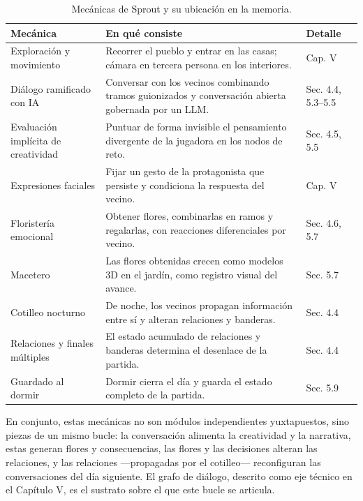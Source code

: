 \documentclass[12pt,twoside,titlepage]{report}
\begin{document}
\begin{table}[h]
  \centering
  \caption{Mecánicas de Sprout y su ubicación en la memoria.}
  \label{tab:mecanicas}
  \begin{footnotesize}
  \renewcommand{\arraystretch}{1.3}
  \begin{tabular}{p{3.6cm}p{7.4cm}p{2cm}}
    \hline
    \textbf{Mecánica} & \textbf{En qué consiste} & \textbf{Detalle} \\
    \hline
    Exploración y movimiento & Recorrer el pueblo y entrar en las casas; cámara en tercera persona en los interiores. & Cap. V \\
    \hline
    Diálogo ramificado con IA & Conversar con los vecinos combinando tramos guionizados y conversación abierta gobernada por un LLM. & Sec. 4.4, 5.3--5.5 \\
    \hline
    Evaluación implícita de creatividad & Puntuar de forma invisible el pensamiento divergente de la jugadora en los nodos de reto. & Sec. 4.5, 5.5 \\
    \hline
    Expresiones faciales & Fijar un gesto de la protagonista que persiste y condiciona la respuesta del vecino. & Cap. V \\
    \hline
    Floristería emocional & Obtener flores, combinarlas en ramos y regalarlas, con reacciones diferenciales por vecino. & Sec. 4.6, 5.7 \\
    \hline
    Macetero & Las flores obtenidas crecen como modelos 3D en el jardín, como registro visual del avance. & Sec. 5.7 \\
    \hline
    Cotilleo nocturno & De noche, los vecinos propagan información entre sí y alteran relaciones y banderas. & Sec. 4.4 \\
    \hline
    Relaciones y finales múltiples & El estado acumulado de relaciones y banderas determina el desenlace de la partida. & Sec. 4.4 \\
    \hline
    Guardado al dormir & Dormir cierra el día y guarda el estado completo de la partida. & Sec. 5.9 \\
    \hline
  \end{tabular}
  \end{footnotesize}
\end{table}

En conjunto, estas mecánicas no son módulos independientes yuxtapuestos, sino piezas de un mismo bucle: la conversación alimenta la creatividad y la narrativa, estas generan flores y consecuencias, las flores y las decisiones alteran las relaciones, y las relaciones ---propagadas por el cotilleo--- reconfiguran las conversaciones del día siguiente. El grafo de diálogo, descrito como eje técnico en el Capítulo V, es el sustrato sobre el que este bucle se articula.
\end{document}
